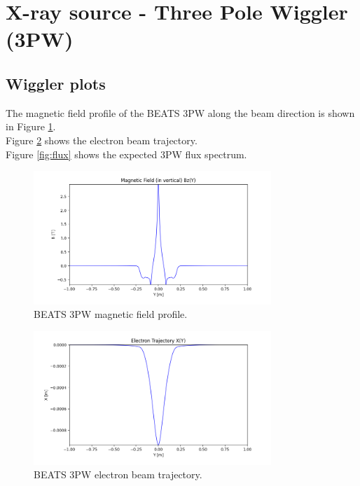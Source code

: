 \section{X-ray source - Three Pole Wiggler (3PW)}
\subsection{Wiggler plots}
The magnetic field profile of the BEATS 3PW along the beam direction is shown in Figure \ref{fig:Bz_y}. \\
Figure \ref{fig:electron_trajectory} shows the electron beam trajectory. \\
Figure \ref{fig:flux} shows the expected 3PW flux spectrum. \\

\begin{figure}[ht]
\centering
\includegraphics[width=0.8\textwidth]{./../../beam_snapshots/3PW/Bz_y.png}
\caption{\label{fig:Bz_y} BEATS 3PW magnetic field profile.}
\end{figure}

\begin{figure}[ht]
\centering
\includegraphics[width=0.8\textwidth]{./../../beam_snapshots/3PW/electron_trajectory.png}
\caption{\label{fig:electron_trajectory} BEATS 3PW electron beam trajectory.}
\end{figure}

